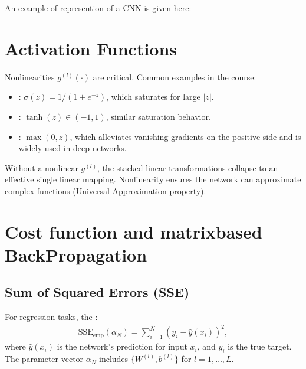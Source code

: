\documentclass[letterpaper,10pt,english]{jupyterBook}
\begin{document}
\sphinxAtStartPar
An example of represention of a CNN is given here:

\sphinxAtStartPar
{}


\section{Activation Functions}
\label{\detokenize{04:activation-functions}}
\sphinxAtStartPar
Nonlinearities \(g^{(l)}(\cdot)\) are critical. Common examples in the course:
\begin{itemize}
\item {} 
\sphinxAtStartPar
{}: \(\sigma(z)=1/(1+e^{-z})\), which saturates for large \(|z|\).

\item {} 
\sphinxAtStartPar
{}: \(\tanh(z)\in(-1,1)\), similar saturation behavior.

\item {} 
\sphinxAtStartPar
{}: \(\max(0,z)\), which alleviates vanishing gradients on the positive side and is widely used in deep networks.

\end{itemize}

\sphinxAtStartPar
Without a nonlinear \(g^{(l)}\), the stacked linear transformations collapse to an effective single linear mapping. Nonlinearity ensures the network can approximate complex functions (Universal Approximation property).


\section{Cost function and matrix\sphinxhyphen{}based Back\sphinxhyphen{}Propagation}
\label{\detokenize{04:cost-function-and-matrix-based-back-propagation}}

\subsection{Sum of Squared Errors (SSE)}
\label{\detokenize{04:sum-of-squared-errors-sse}}
\sphinxAtStartPar
For regression tasks, the :
\begin{equation*}
\begin{split}
\mathrm{SSE}_{\mathrm{emp}}(\alpha_N) = \sum_{i=1}^N (y_i - \hat{y}(x_i))^2,
\end{split}
\end{equation*}
\sphinxAtStartPar
where \(\hat{y}(x_i)\) is the network’s prediction for input \(x_i\), and \(y_i\) is the true target. The parameter vector \(\alpha_N\) includes \(\{W^{(l)}, b^{(l)}\}\) for \(l=1,\ldots,L\).
\end{document}
